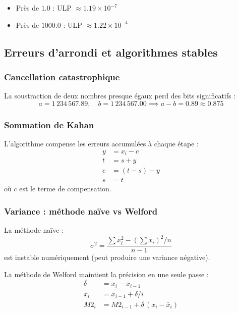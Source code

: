 \documentclass[11pt,a4paper]{article}
\begin{document}
\begin{itemize}[itemsep=2pt]
    \item Près de $1.0$ : ULP $\approx 1.19 \times 10^{-7}$
    \item Près de $1000.0$ : ULP $\approx 1.22 \times 10^{-4}$
\end{itemize}

\subsection{Erreurs d'arrondi et algorithmes stables}

\subsubsection{Cancellation catastrophique}

La soustraction de deux nombres presque égaux perd des bits significatifs :
\[
a = 1\,234\,567.89,\quad b = 1\,234\,567.00 \implies a - b = 0.89 \approx 0.875
\]

\subsubsection{Sommation de Kahan}

L'algorithme compense les erreurs accumulées à chaque étape :
\begin{align}
y &= x_i - c \\
t &= s + y \\
c &= (t - s) - y \\
s &= t
\end{align}
où $c$ est le terme de compensation.

\subsubsection{Variance : méthode naïve vs Welford}

La méthode naïve :
\[
\sigma^2 = \frac{\displaystyle\sum x_i^2 - \left(\sum x_i\right)^2/n}{n-1}
\]
est instable numériquement (peut produire une variance négative).

La méthode de Welford maintient la précision en une seule passe :
\begin{align}
\delta   &= x_i - \bar{x}_{i-1} \\
\bar{x}_i &= \bar{x}_{i-1} + \delta/i \\
M2_i     &= M2_{i-1} + \delta\,(x_i - \bar{x}_i)
\end{align}
\end{document}
